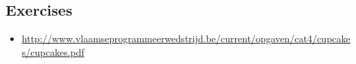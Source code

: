 \subsection{Exercises}
\begin{itemize}
 \item \url{http://www.vlaamseprogrammeerwedstrijd.be/current/opgaven/cat4/cupcakes/cupcakes.pdf}
\end{itemize}

